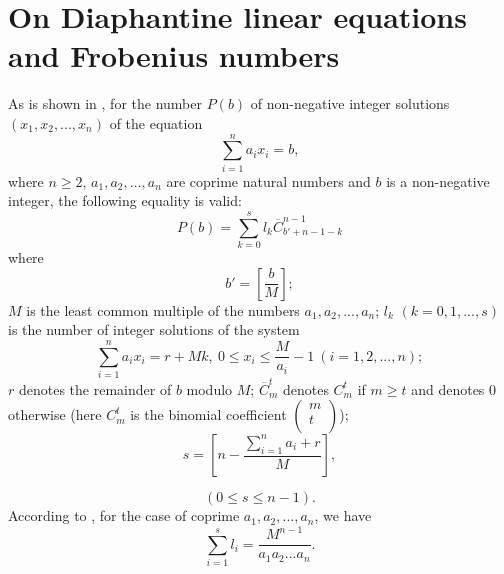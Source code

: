 \documentclass[12pt,reqno,intlim]{amsart}
\numberwithin{equation}{section}
\theoremstyle{definition}
\theoremstyle{remark}
\begin{document}
\section{On Diaphantine linear equations and Frobenius numbers}

As is shown in \cite{S}, for the number $P(b)$ of non-negative integer solutions $(x_1,x_2,...,x_n)$ of the equation 
\begin{equation} \label{2.2}
\sum_{i=1}^{n}a_ix_i=b,
\end{equation} where $n\geq 2$, $a_1,a_2,...,a_n$ are coprime natural numbers and $b$ is a non-negative integer, the following equality is valid:
\begin{equation} \label{2.3}
P(b)=\sum_{k=0}^{s}l_k \overline{C}^{n-1}_{b'+n-1-k}
\end{equation}
\noindent where $$b'=\left[\frac{b}{M}\right];$$ $M$ is the least common multiple of the numbers $a_1,a_2,...,a_n$; $l_k$ $(k=0,1,...,s)$ is the number of integer solutions of the system
$$\sum_{i=1}^{n}a_ix_i=r+Mk, ~0\leq x_i\leq \frac{M}{a_i}-1 ~ (i=1,2,...,n);$$
$r$ denotes the remainder of $b$ modulo $M$; $\overline{C}_m^{t}$ denotes $C_m^{t}$ if $m\geq t$ and denotes $0$ otherwise (here $C_m^{t}$ is the binomial coefficient ${\begin{pmatrix}m\\t\\\end{pmatrix}}$);
\begin{equation} \label{2.4}
s=\left[n-\frac{\sum_{i=1}^{n}a_i+r}{M}\right],
\end{equation}

$$(0\leq s\leq n-1).$$
According to \cite{S}, for the case of coprime $a_1,a_2,...,a_n$, we have
\begin{equation} \label{2.6}
\sum_{i=1}^{s}l_i=\frac{M^{n-1}}{a_1a_2...a_n}.
\end{equation}
\end{document}
